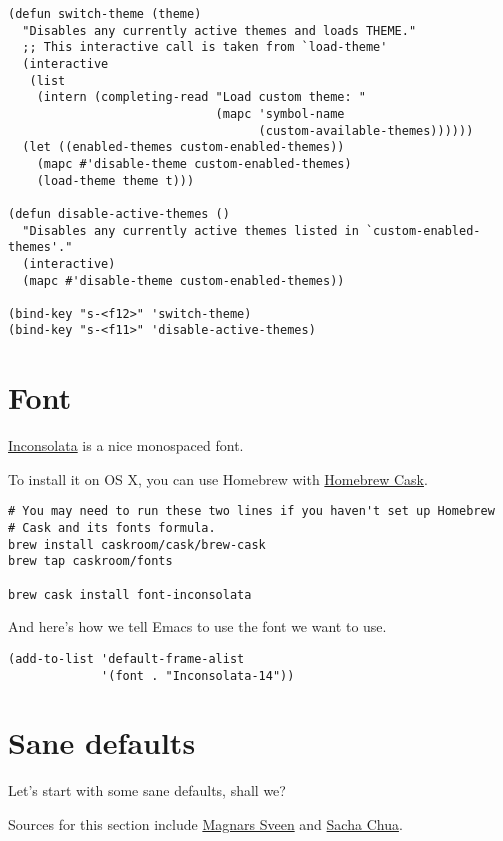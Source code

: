\documentclass[11pt]{article}
\begin{document}
\begin{verbatim}
(defun switch-theme (theme)
  "Disables any currently active themes and loads THEME."
  ;; This interactive call is taken from `load-theme'
  (interactive
   (list
    (intern (completing-read "Load custom theme: "
                             (mapc 'symbol-name
                                   (custom-available-themes))))))
  (let ((enabled-themes custom-enabled-themes))
    (mapc #'disable-theme custom-enabled-themes)
    (load-theme theme t)))

(defun disable-active-themes ()
  "Disables any currently active themes listed in `custom-enabled-themes'."
  (interactive)
  (mapc #'disable-theme custom-enabled-themes))

(bind-key "s-<f12>" 'switch-theme)
(bind-key "s-<f11>" 'disable-active-themes)
\end{verbatim}

\section{Font}
\label{sec-5}

\href{http://levien.com/type/myfonts/inconsolata.html}{Inconsolata} is a nice monospaced font.

To install it on OS X, you can use Homebrew with \href{http://caskroom.io/}{Homebrew Cask}.

\begin{verbatim}
# You may need to run these two lines if you haven't set up Homebrew
# Cask and its fonts formula.
brew install caskroom/cask/brew-cask
brew tap caskroom/fonts

brew cask install font-inconsolata
\end{verbatim}

And here's how we tell Emacs to use the font we want to use.

\begin{verbatim}
(add-to-list 'default-frame-alist
             '(font . "Inconsolata-14"))
\end{verbatim}

\section{Sane defaults}
\label{sec-6}

Let's start with some sane defaults, shall we?

Sources for this section include \href{https://github.com/magnars/.emacs.d/blob/master/settings/sane-defaults.el}{Magnars Sveen} and \href{http://pages.sachachua.com/.emacs.d/Sacha.html}{Sacha Chua}.
\end{document}
